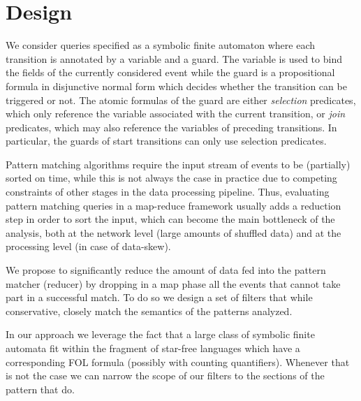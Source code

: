 \section{Design}

We consider queries specified as a symbolic finite automaton where each
transition is annotated by a variable and a guard.
The variable is used to bind the fields of the currently considered event while the guard is a propositional formula in disjunctive normal form which decides whether the transition can be triggered or not.  
The atomic formulas of the guard are either {\em selection} predicates, which only reference the variable associated with the current transition,
or {\em join} predicates, which may also reference the variables of preceding transitions.
In particular, the guards of start transitions can only use selection predicates.  
   
Pattern matching algorithms require the input stream of events to be (partially) sorted on time, while this is not always the case in practice due to competing constraints of other stages in the data processing pipeline. 
Thus, evaluating pattern matching queries in a map-reduce framework usually adds a reduction step in order to sort the input, which can become the main bottleneck of the analysis, both at the network level (large amounts of shuffled data) and at
the processing level (in case of data-skew).

 

We propose to significantly reduce the amount of data fed into the pattern
matcher (reducer) by dropping in a map phase all the events that cannot take
part in a successful match.
To do so we design a set of filters that while conservative, closely match the
semantics of the patterns analyzed.

\begin{comment}
We propose three levels of abstraction.
The first enforces the join constraints between different transitions as
expressed by join predicates within the transition guards.
The second one further imposes time windowing constraints (all events of a
successful match must occur within a timeout of the first event in the match).
Finally the last one enforces ordering constraints between {\em consecutive}
transitions of the pattern.
\end{comment}

In our approach we leverage the fact that a large class of symbolic finite
automata fit within the fragment of star-free languages which
have a corresponding FOL formula (possibly with counting quantifiers).
Whenever that is not the case we can narrow the scope of our filters to the
sections of the pattern that do.
 

